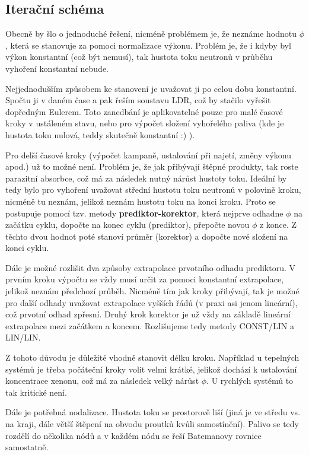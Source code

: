 \subsection{Iterační schéma}

Obecně by šlo o jednoduché řešení, nicméně problémem je, že neznáme hodnotu $\phi$, která se stanovuje za pomoci normalizace výkonu. Problém je, že i kdyby byl výkon konstantní (což být nemusí), tak hustota toku neutronů v průběhu vyhoření konstantní nebude.

Nejjednodušším způsobem ke stanovení je uvažovat ji po celou dobu konstantní. Spočtu ji v daném čase a pak řeším soustavu LDR, což by stačilo vyřešit dopředným Eulerem. Toto zanedbání je aplikovatelné pouze pro malé časové kroky v ustáleném stavu, nebo pro výpočet složení vyhořelého paliva (kde je hustota toku nulová, teddy skutečně konstantní :) ).

Pro delší časové kroky (výpočet kampaně, ustalování při najetí, změny výkonu apod.) už to možné není. Problém je, že jak přibývají štěpné produkty, tak roste parazitní absorbce, což má za následek nutný nárůst hustoty toku. Ideální by tedy bylo pro vyhoření uvažovat střední hustotu toku neutronů v polovině kroku, nicméně tu neznám, jelikož neznám hustotu toku na konci kroku. Proto se postupuje pomocí tzv. metody \textbf{prediktor-korektor}, která nejprve odhadne $\phi$ na začátku cyklu, dopočte na konec cyklu (prediktor), přepočte novou $\phi$ z konce. Z těchto dvou hodnot poté stanoví průměr (korektor) a dopočte nové složení na konci cyklu.

Dále je možné rozlišit dva způsoby extrapolace prvotního odhadu prediktoru. V prvním kroku výpočtu se vždy musí určit za pomoci konstantní extrapolace, jelikož neznám předchozí průběh. Nicméně tím jak kroky přibývají, tak je možné pro další odhady uvažovat extrapolace vyšších řádů (v praxi asi jenom lineární), což prvotní odhad zpřesní. Druhý krok korektor je už vždy na základě lineární extrapolace mezi začátkem a koncem. Rozlišujeme tedy metody CONST/LIN a LIN/LIN.

Z tohoto důvodu je důležité vhodně stanovit délku kroku. Například u tepelných systémů je třeba počáteční kroky volit velmi krátké, jelikož dochází k ustalování koncentrace xenonu, což má za následek velký nárůst $\phi$. U rychlých systémů to tak kritické není.

Dále je potřebná nodalizace. Hustota toku se prostorově liší (jiná je ve středu vs. na kraji, dále větší štěpení na obvodu proutků kvůli samostínění). Palivo se tedy rozdělí do několika nódů a v každém nódu se řeší Batemanovy rovnice samostatně.

